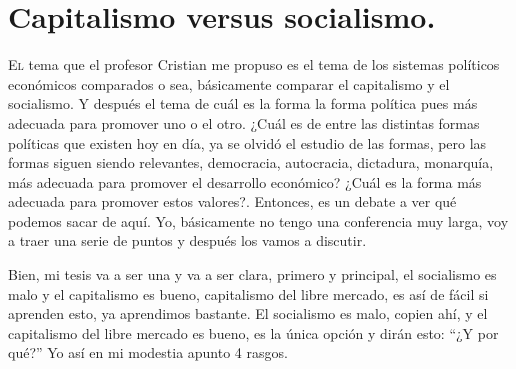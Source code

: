 \chapter{Capitalismo versus socialismo.}


\lettrine[lines=2, findent=3pt, nindent=0pt]{E}{l} tema que el profesor Cristian me propuso es el tema de los sistemas políticos económicos comparados o sea, básicamente comparar el capitalismo y el socialismo. Y después el tema de cuál es la forma la forma política pues más adecuada para promover uno o el otro. ¿Cuál es de entre las distintas formas políticas que existen hoy en día, ya se olvidó el estudio de las formas, pero las formas siguen siendo relevantes, democracia, autocracia, dictadura, monarquía, más adecuada para promover el desarrollo económico? ¿Cuál es la forma más adecuada para promover estos valores?. Entonces, es un debate a ver qué podemos sacar de aquí. Yo, básicamente no tengo una conferencia muy larga, voy a traer una serie de puntos y después los vamos a discutir.

Bien, mi tesis va a ser una y va a ser clara, primero y principal, el socialismo es malo y el capitalismo es bueno, capitalismo del libre mercado, es así de fácil si aprenden esto, ya aprendimos bastante. El socialismo es malo, copien ahí, y el capitalismo del libre mercado es bueno, es la única opción y dirán esto: \enquote{¿Y por qué?} Yo así en mi modestia apunto 4 rasgos.

